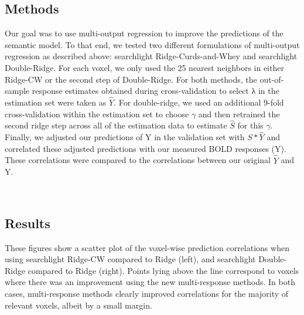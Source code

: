 \documentclass{article}
\begin{document}
\subsection{Methods}\label{methods}

Our goal was to use multi-output regression to improve the predictions
of the semantic model. To that end, we tested two different formulations
of multi-output regression as described above: searchlight
Ridge-Curds-and-Whey and searchlight Double-Ridge. For each voxel, we
only used the 25 nearest neighbors in either Ridge-CW or the second step
of Double-Ridge. For both methods, the out-of-sample response estimates
obtained during cross-validation to select λ in the estimation set were
taken as \(\hat Y\). For double-ridge, we used an additional 9-fold
cross-validation within the estimation set to choose \(\gamma\) and then
retrained the second ridge step across all of the estimation data to
estimate \(\hat S\) for this \(\gamma\). Finally, we adjusted our
predictions of Y in the validation set with \(S*\hat Y\) and correlated
these adjusted predictions with our measured BOLD responses (Y). These
correlations were compared to the correlations between our original
\(\hat Y\) and Y.

    \begin{center}
    \end{center}
    { \hspace*{\fill} \\}


\subsection{Results}
        
    These figures show a scatter plot of the voxel-wise prediction
correlations when using searchlight Ridge-CW compared to Ridge (left),
and searchlight Double-Ridge compared to Ridge (right). Points lying
above the line correspond to voxels where there was an improvement using
the new multi-response methods. In both cases, multi-response methods
clearly improved correlations for the majority of relevant voxels,
albeit by a small margin.


    \begin{center}
    \end{center}
    { \hspace*{\fill} \\}
    
\end{document}
